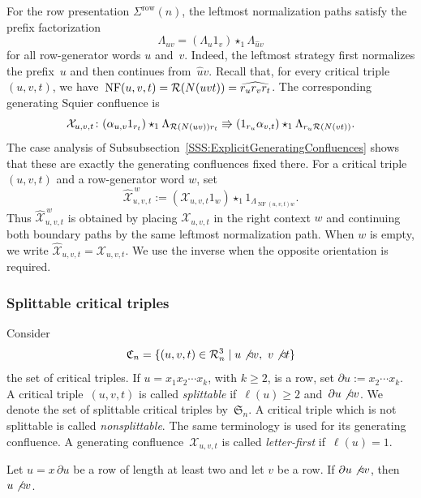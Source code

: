 \documentclass[a4paper, twoside, 11pt, english]{article}
\newcommand{\npath}[1]{\Lambda_{#1}}
\begin{document}
For the row presentation $\Sigma^{\mathrm{row}}(n)$, the leftmost
normalization paths satisfy the prefix factorization
\[
\npath{uv}
=
(\npath{u}1_v)\star_1\npath{\widehat u v}
\]
for all row-generator words $u$ and~$v$. Indeed, the leftmost strategy first
normalizes the prefix~$u$ and then continues from~$\widehat u v$.
Recall that, for every critical triple $(u,v,t)$, we have~$\operatorname{NF}(u,v,t)
=
\mathcal{R}(N(uvt))
=
\widehat{r_ur_vr_t}$.
The corresponding generating Squier confluence is
\[
\mathcal X_{u,v,t}\colon
(\alpha_{u,v}1_{r_t})\star_1
\npath{\Rr(N(uv))r_t}
\Rrightarrow
(1_{r_u}\alpha_{v,t})\star_1
\npath{r_u\Rr(N(vt))}.
\]
The case analysis of
Subsubsection~\ref{SSS:ExplicitGeneratingConfluences} shows that these are
exactly the generating confluences fixed there. 
For a critical triple $(u,v,t)$ and a row-generator word $w$, set
\[
\widehat{\mathcal X}^{\,w}_{u,v,t}
:=
(\mathcal X_{u,v,t}1_w)\star_1
1_{\npath{\operatorname{NF}(u,v,t)w}}.
\]
Thus $\widehat{\mathcal X}^{\,w}_{u,v,t}$ is obtained by placing
$\mathcal X_{u,v,t}$ in the right context $w$ and continuing both boundary
paths by the same leftmost normalization path. When $w$ is empty, we write
$\widehat{\mathcal X}_{u,v,t}=\mathcal X_{u,v,t}$. We use the inverse when
the opposite orientation is required.

\subsubsection{Splittable critical triples}

Consider
\[
\mathfrak C_n
=
\{(u,v,t)\in\mathcal{R}_n^3
\mid
u\not\triangleleft v,\ v\not\triangleleft t\}
\]
the set of critical triples. If $u=x_1x_2\cdots x_k$, with $k\ge2$, is a
row, set $\partial u:=x_2\cdots x_k$. A critical triple~$(u,v,t)$ is called \emph{splittable} if~$\ell(u)\ge2$ and~$\partial u\not\triangleleft v$.
We denote the set of splittable critical triples by~$\mathfrak S_n$.
A critical triple which is not splittable is called
\emph{nonsplittable}. The same terminology is used for its generating
confluence. A generating confluence~$\mathcal X_{u,v,t}$ is called
\emph{letter-first} if~$\ell(u)=1$.



\begin{lemma}
\label{L:SplittableAutomaticallyCriticalFinal}
Let $u=x\,\partial u$ be a row of length at least two and let $v$ be a row.
If $\partial u\not\triangleleft v$, then $u\not\triangleleft v$.
\end{lemma}
\end{document}
